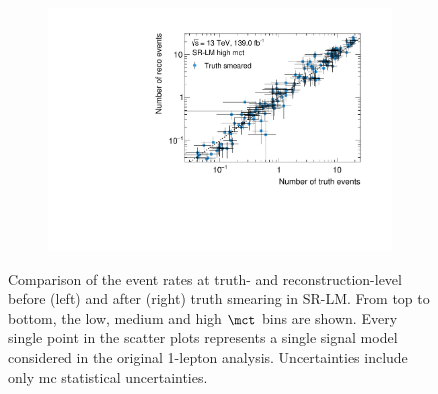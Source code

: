 \begin{figure}
\begin{subfigure}[b]{0.49\linewidth}
	\end{subfigure}\hfill
	\begin{subfigure}[b]{0.49\linewidth}
		\centering\includegraphics[width=\textwidth]{yields_SR-LM_high_mct_smeared}
	\end{subfigure}
	\caption{Comparison of the event rates at truth- and reconstruction-level before (left) and after (right) truth smearing in SR-LM. From top to bottom, the low, medium and high $\mct$ bins are shown. Every single point in the scatter plots represents a single signal model considered in the original 1-lepton analysis. Uncertainties include only \gls{mc} statistical uncertainties.}
	\label{fig:smearing_signal_regions_1}
\end{figure}

